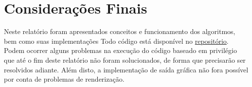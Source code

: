 \documentclass[10pt,conference]{IEEEtran}
\begin{document}

\section{Considerações Finais}
Neste relatório foram apresentados conceitos e funcionamento dos algoritmos, bem como suas implementações Todo código está disponível no \href{https://github.com/christalfepe/Sistemas-Distribu-dos.git}{repositório}. Podem ocorrer alguns problemas na execução do código baseado em privilégio que até o fim deste relatório não foram solucionados, de forma que precisarão ser resolvidos adiante. Além disto, a implementação de saída gráfica não fora possível por conta de problemas de renderização.







\end{document}
